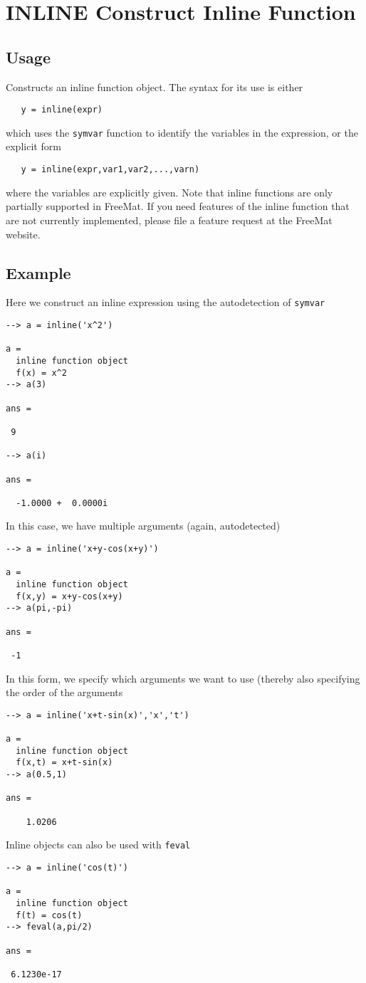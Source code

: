 \section{INLINE Construct Inline Function}

\subsection{Usage}

Constructs an inline function object.  The syntax for its use is
either
\begin{verbatim}
   y = inline(expr)
\end{verbatim}
which uses the \verb|symvar| function to identify the variables in the
expression, or the explicit form
\begin{verbatim}
   y = inline(expr,var1,var2,...,varn)
\end{verbatim}
where the variables are explicitly given.  Note that inline functions
are only partially supported in FreeMat.  If you need features of the
inline function that are not currently implemented, please file a
feature request at the FreeMat website.
\subsection{Example}

Here we construct an inline expression using the autodetection 
of \verb|symvar|
\begin{verbatim}
--> a = inline('x^2')

a = 
  inline function object
  f(x) = x^2
--> a(3)

ans = 

 9 

--> a(i)

ans = 

  -1.0000 +  0.0000i 
\end{verbatim}
In this case, we have multiple arguments (again, autodetected)
\begin{verbatim}
--> a = inline('x+y-cos(x+y)')

a = 
  inline function object
  f(x,y) = x+y-cos(x+y)
--> a(pi,-pi)

ans = 

 -1 
\end{verbatim}
In this form, we specify which arguments we want to use (thereby
also specifying the order of the arguments
\begin{verbatim}
--> a = inline('x+t-sin(x)','x','t')

a = 
  inline function object
  f(x,t) = x+t-sin(x)
--> a(0.5,1)

ans = 

    1.0206 
\end{verbatim}
Inline objects can also be used with \verb|feval|
\begin{verbatim}
--> a = inline('cos(t)')

a = 
  inline function object
  f(t) = cos(t)
--> feval(a,pi/2)

ans = 

 6.1230e-17 
\end{verbatim}
